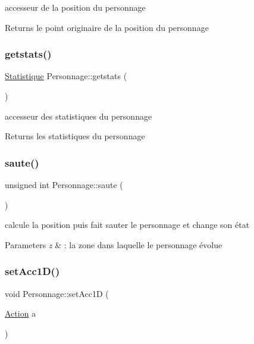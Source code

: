 accesseur de la position du personnage 

\begin{DoxyReturn}{Returns}
le point originaire de la position du personnage 
\end{DoxyReturn}
\mbox{\label{class_personnage_a972889d9844a547432c2ccd880d13d30}} 
\subsubsection{\texorpdfstring{getstats()}{getstats()}}
{\footnotesize\ttfamily \hyperlink{class_statistique}{Statistique} Personnage\+::getstats (\begin{DoxyParamCaption}{ }\end{DoxyParamCaption})}



accesseur des statistiques du personnage 

\begin{DoxyReturn}{Returns}
les statistiques du personnage 
\end{DoxyReturn}
\mbox{\label{class_personnage_ad4433e84bb7db52eef9730a8d82bf2e7}} 
\subsubsection{\texorpdfstring{saute()}{saute()}}
{\footnotesize\ttfamily unsigned int Personnage\+::saute (\begin{DoxyParamCaption}{ }\end{DoxyParamCaption})}



calcule la position puis fait sauter le personnage et change son état 


\begin{DoxyParams}{Parameters}
{\em z} & \+: la zone dans laquelle le personnage évolue \\
\hline
\end{DoxyParams}
\mbox{\label{class_personnage_aee7eb2a2752f7bec3ef88b39bda2796c}} 
\subsubsection{\texorpdfstring{set\+Acc1\+D()}{setAcc1D()}}
{\footnotesize\ttfamily void Personnage\+::set\+Acc1D (\begin{DoxyParamCaption}\item[{\hyperlink{class_action}{Action}}]{a }\end{DoxyParamCaption})}



